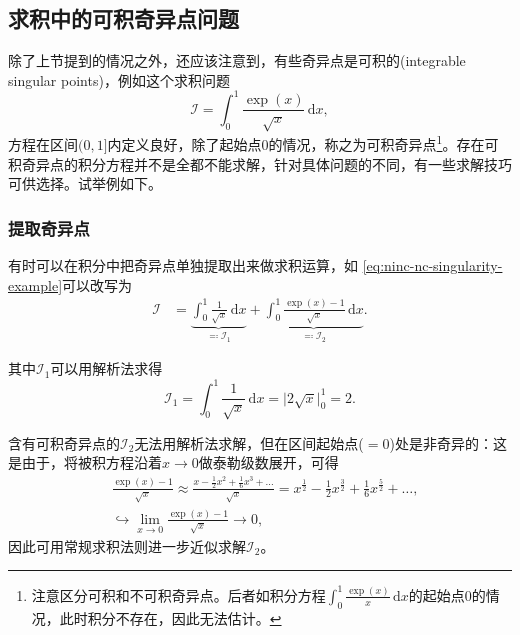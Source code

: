 \subsection{求积中的可积奇异点问题}
\label{sec:ninc-nc-singularity}
除了上节提到的情况之外，还应该注意到，有些奇异点是可积的(integrable singular points)，例如这个求积问题
\begin{equation}
  \label{eq:ninc-nc-singularity-example}
  \mathcal{I} = \int_{0}^{1} \frac{\exp(x)}{\sqrt{x}} \, \mathrm{d} x,
\end{equation}
方程在区间$(0,1]$内定义良好，除了起始点$0$的情况，称之为可积奇异点\footnote{注意区分可积和不可积奇异点。后者如积分方程$\int_{0}^{1} \frac{\exp (x)}{x} \, \mathrm{d} x $的起始点$0$的情况，此时积分不存在，因此无法估计。}。存在可积奇异点的积分方程并不是全都不能求解，针对具体问题的不同，有一些求解技巧可供选择。试举例如下。

\subsubsection{提取奇异点}
\label{sec:ninc-nc-singularity-isolation}
有时可以在积分中把奇异点单独提取出来做求积运算，如  \eqref{eq:ninc-nc-singularity-example}可以改写为
\begin{equation*}
  \begin{split}
    \mathcal{I} & =
    \underbrace{
    \int_{0}^{1} \frac{1}{\sqrt{x}} \, \mathrm{d} x
    }_{\eqqcolon \mathcal{I}_{1}}
    + \underbrace{
    \int_{0}^{1} \frac{
    \exp (x) -1
    }{\sqrt{x}} \, \mathrm{d} x
    }_{\eqqcolon \mathcal{I}_{2}}.
  \end{split}
\end{equation*}

其中$\mathcal{I}_{1}$可以用解析法求得
\begin{equation*}
  \mathcal{I}_{1} = \int_{0}^{1} \frac{1}{\sqrt{x}} \, \mathrm{d} x = \big| 2 \sqrt{x} \big|_{0}^{1} = 2.
\end{equation*}

含有可积奇异点的$\mathcal{I}_{2}$无法用解析法求解，但在区间起始点($=0$)处是非奇异的：这是由于，将被积方程沿着$x \rightarrow 0$做泰勒级数展开，可得
\begin{equation*}
  \begin{split}
    & \frac{
    \exp (x) -1
    }{\sqrt{x}}
    \approx \frac{
    x - \frac{1}{2}x^{2} + \frac{1}{6} x^{3} + \ldots
    }{
    \sqrt{x}
    } = x^{\frac{1}{2}} - \frac{1}{2}x^{\frac{3}{2}} + \frac{1}{6} x^{\frac{5}{2}} + \ldots, \\
    & \hookrightarrow \lim_{x \rightarrow 0}
    \frac{
    \exp (x) -1
    }{\sqrt{x}} \rightarrow 0,
  \end{split}
\end{equation*}
因此可用常规求积法则进一步近似求解$\mathcal{I}_{2}$。

